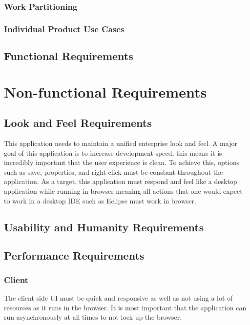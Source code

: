 \documentclass[12pt, titlepage]{article}
\begin{document}
    \subsubsection{Work Partitioning}

    \subsubsection{Individual Product Use Cases}

  \subsection{Functional Requirements}

\section{Non-functional Requirements}

  \subsection{Look and Feel Requirements}
  This application needs to maintain a unified enterprise look and feel. A
   major goal of this application is to increase development speed, this 
   means it is incredibly important that the user experience is clean. To 
   achieve this, options such as save, properties, and right-click must be 
   constant throughout the application. As a target, this application must 
   respond and feel like a desktop application while running in browser 
   meaning all actions that one would expect to work in a desktop IDE such
    as Eclipse must work in browser.

  \subsection{Usability and Humanity Requirements}

  \subsection{Performance Requirements}
    \subsubsection{Client}
    The client side UI must be quick and responsive as well as not using a 
    lot of resources as it runs in the browser. It is most important that the 
    application can run asynchronously at all times to not lock up the browser.
    
\end{document}
